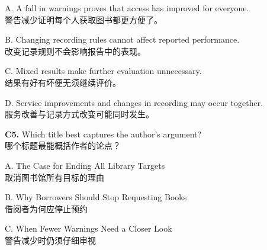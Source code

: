 \documentclass[a4paper,11pt,openany]{report}
\newcommand{\zhline}[1]{{\CJKsf\color{bodygrey}#1}}
\begin{document}
\begin{samepage}
A. A fall in warnings proves that access has improved for everyone.\\
\zhline{警告减少证明每个人获取图书都更方便了。}
\par\end{samepage}

\begin{samepage}
B. Changing recording rules cannot affect reported performance.\\
\zhline{改变记录规则不会影响报告中的表现。}
\par\end{samepage}

\begin{samepage}
C. Mixed results make further evaluation unnecessary.\\
\zhline{结果有好有坏便无须继续评价。}
\par\end{samepage}

\begin{samepage}
D. Service improvements and changes in recording may occur together.\\
\zhline{服务改善与记录方式改变可能同时发生。}
\par\end{samepage}

\begin{samepage}
\textbf{C5.} Which title best captures the author's argument?\\
\zhline{哪个标题最能概括作者的论点？}
\par\end{samepage}

\begin{samepage}
A. The Case for Ending All Library Targets\\
\zhline{取消图书馆所有目标的理由}
\par\end{samepage}

\begin{samepage}
B. Why Borrowers Should Stop Requesting Books\\
\zhline{借阅者为何应停止预约}
\par\end{samepage}

\begin{samepage}
C. When Fewer Warnings Need a Closer Look\\
\zhline{警告减少时仍须仔细审视}
\par\end{samepage}
\end{document}
